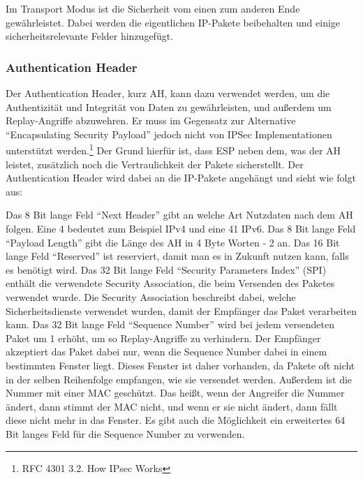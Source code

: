 \documentclass[12pt]{scrartcl}
\begin{document}
Im Transport Modus ist die Sicherheit vom einen zum anderen Ende gewährleistet. Dabei werden die eigentlichen IP-Pakete beibehalten und einige sicherheitsrelevante Felder hinzugefügt.

\subsubsection{Authentication Header}
Der Authentication Header, kurz AH, kann dazu verwendet werden, um die Authentizität und Integrität von Daten zu gewährleisten, und außerdem um Replay-Angriffe abzuwehren. Er muss im Gegensatz zur Alternative "`Encapsulating Security Payload"' jedoch nicht von IPSec Implementationen unterstützt werden.\footnote{RFC 4301 3.2.  How IPsec Works} Der Grund hierfür ist, dass ESP neben dem, was der AH leistet, zusätzlich noch die Vertraulichkeit der Pakete sicherstellt. Der Authentication Header wird dabei an die IP-Pakete angehängt und sieht wie folgt aus:


Das 8 Bit lange Feld "`Next Header"' gibt an welche Art Nutzdaten nach dem AH folgen. Eine 4 bedeutet zum Beispiel IPv4 und eine 41 IPv6. Das 8 Bit lange Feld "`Payload Length"' gibt die Länge des AH in 4 Byte Worten - 2 an. Das 16 Bit lange Feld "`Reserved"' ist reserviert, damit man es in Zukunft nutzen kann, falls es benötigt wird. Das 32 Bit lange Feld "`Security Parameters Index"' (SPI) enthält die verwendete Security Association, die beim Versenden des Paketes verwendet wurde. Die Security Association beschreibt dabei, welche Sicherheitsdienste verwendet wurden, damit der Empfänger das Paket verarbeiten kann. Das 32 Bit lange Feld "`Sequence Number"' wird bei jedem versendeten Paket um 1 erhöht, um so Replay-Angriffe zu verhindern. Der Empfänger akzeptiert das Paket dabei nur, wenn die Sequence Number dabei in einem bestimmten Fenster liegt. Dieses Fenster ist daher vorhanden, da Pakete oft nicht in der selben Reihenfolge empfangen, wie sie versendet werden. Außerdem ist die Nummer mit einer MAC geschützt. Das heißt, wenn der Angreifer die Nummer ändert, dann stimmt der MAC nicht, und wenn er sie nicht ändert, dann fällt diese nicht mehr in das Fenster. Es gibt auch die Möglichkeit ein erweitertes 64 Bit langes Feld für die Sequence Number zu verwenden. 
\end{document}
